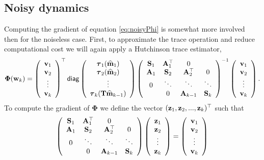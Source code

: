\documentclass[11pt]{article}
\newcommand{\bfA}	{{\bf{A}}}
\newcommand{\bfS}	{{\bf{S}}}
\newcommand{\bfT}	{{\bf{T}}}
\newcommand{\bfm}	{{\bf{m}}}
\newcommand{\bfv}	{{\bf{v}}}
\newcommand{\bfw}	{{\bf{w}}}
\newcommand{\bfz}	{{\bf{z}}}
\newcommand{\bfPhi}     {{\boldsymbol \Phi}}
\newcommand{\bftau}      {{\boldsymbol \tau}}
\newcommand{\bfmhat}    {{\widehat{\bfm}}}
\begin{document}
\subsection{Noisy dynamics}

Computing the gradient of equation \eqref{eq:noisyPhi} is somewhat more involved then for the noiseless case. 
First, to approximate the trace operation and reduce computational cost we will again apply a Hutchinson trace estimator,
\begin{equation}
\bfPhi(\bfw_k) =  
\left(\begin{array}{c} \bfv_1 \\ \bfv_2\\ \vdots\\ \bfv_k \end{array}\right)^{\top}
{\sf diag}
\left( \begin{array}{c}
\bftau_1(\bfmhat_1) \\ 
\bftau_2(\bfmhat_2)  \\
\vdots \\
\bftau_k(\bfT\bfmhat_{k-1})\end{array}\right)
\left(\begin{array}{cccc}
 \bfS_1 &  \bfA^{\top}_1 & 0 & \\
 \bfA_1 & \bfS_2 & \bfA^{\top}_2 & 0 \\
 0 & \ddots & \ddots & \ddots \\
 & 0 & \bfA_{k-1} & \bfS_k
  \end{array}\right)^{-1}
  \left(\begin{array}{c} \bfv_1 \\ \bfv_2\\ \vdots\\ \bfv_k \end{array}\right).
\end{equation}
To compute the gradient of $\bfPhi$ we define the vector  $(\bfz_1,\bfz_2,...,\bfz_k)^{\top}$ such that
\begin{equation}
\left(\begin{array}{cccc}
 \bfS_1 &  \bfA^{\top}_1 & 0 & \\
 \bfA_1 & \bfS_2 & \bfA^{\top}_2 & 0 \\
 0 & \ddots & \ddots & \ddots \\
 & 0 & \bfA_{k-1} & \bfS_k
  \end{array}\right)
  \left(\begin{array}{c} \bfz_1 \\ \bfz_2\\ \vdots\\ \bfz_k \end{array}\right)
  =
  \left(\begin{array}{c} \bfv_1 \\ \bfv_2\\ \vdots\\ \bfv_k \end{array}\right)
\end{equation}
\end{document}
